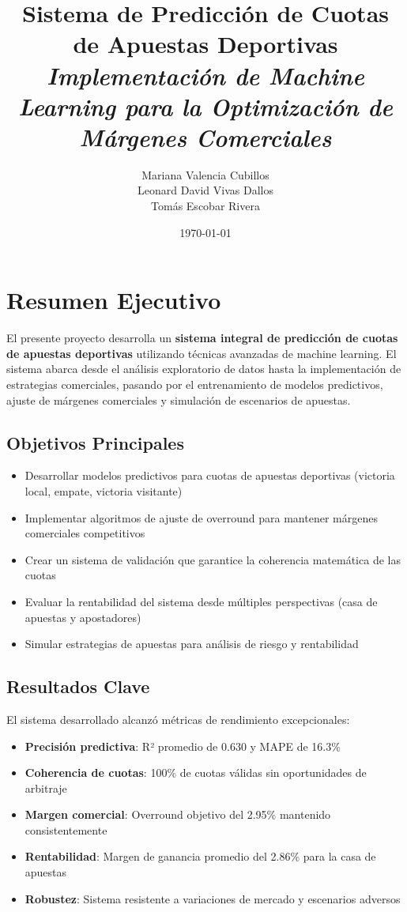 \documentclass{article}
\title{
    \Huge\textbf{Sistema de Predicción de Cuotas de Apuestas Deportivas} \\
    \Large\textit{Implementación de Machine Learning para la Optimización de Márgenes Comerciales}
}
\author{
    Mariana Valencia Cubillos \\
    Leonard David Vivas Dallos \\
    Tomás Escobar Rivera
}
\date{\today}
\begin{document}
\maketitle

\newpage

\tableofcontents

\newpage

\section{Resumen Ejecutivo}

El presente proyecto desarrolla un \textbf{sistema integral de predicción de cuotas de apuestas deportivas} utilizando técnicas avanzadas de machine learning. El sistema abarca desde el análisis exploratorio de datos hasta la implementación de estrategias comerciales, pasando por el entrenamiento de modelos predictivos, ajuste de márgenes comerciales y simulación de escenarios de apuestas.

\subsection{Objetivos Principales}

\begin{itemize}[itemsep=0.5em]
    \item Desarrollar modelos predictivos para cuotas de apuestas deportivas (victoria local, empate, victoria visitante)
    \item Implementar algoritmos de ajuste de overround para mantener márgenes comerciales competitivos
    \item Crear un sistema de validación que garantice la coherencia matemática de las cuotas
    \item Evaluar la rentabilidad del sistema desde múltiples perspectivas (casa de apuestas y apostadores)
    \item Simular estrategias de apuestas para análisis de riesgo y rentabilidad
\end{itemize}

\subsection{Resultados Clave}

El sistema desarrollado alcanzó métricas de rendimiento excepcionales:

\begin{itemize}[itemsep=0.5em]
    \item \textbf{Precisión predictiva}: R² promedio de 0.630 y MAPE de 16.3\%
    \item \textbf{Coherencia de cuotas}: 100\% de cuotas válidas sin oportunidades de arbitraje
    \item \textbf{Margen comercial}: Overround objetivo del 2.95\% mantenido consistentemente
    \item \textbf{Rentabilidad}: Margen de ganancia promedio del 2.86\% para la casa de apuestas
    \item \textbf{Robustez}: Sistema resistente a variaciones de mercado y escenarios adversos
\end{itemize}
\end{document}
